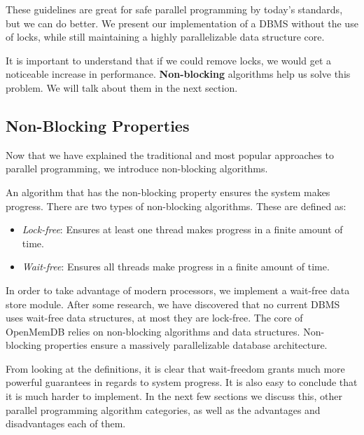 \documentclass[letterpaper, 12pt]{article}
\begin{document}
These guidelines are great for safe parallel programming by today's standards, but we can do better.
We present our implementation of a DBMS without the use of locks, while still maintaining a highly 
parallelizable data structure core.

\par\vspace{\baselineskip}

It is important to understand that if we could remove locks, we would get a noticeable increase in performance.
{\bfseries Non-blocking} algorithms help us solve this problem. We will talk about them in the next section.

\subsection{Non-Blocking Properties}

Now that we have explained the traditional and most popular approaches to parallel programming, we introduce non-blocking algorithms.

\par\vspace{\baselineskip}
An algorithm that has the non-blocking property ensures the system makes progress. There are 
two types of non-blocking algorithms. These are defined as:
\begin{itemize}
	\item \textit{Lock-free}: Ensures at least one thread makes progress in a finite amount of time.
	\item \textit{Wait-free}: Ensures all threads make progress in a finite amount of time.
\end{itemize}
In order to take advantage of modern processors, we implement a wait-free data store module.
After some research, we have discovered that no current DBMS uses wait-free data
structures, at most they are lock-free. The core of OpenMemDB relies on non-blocking algorithms and data
structures. Non-blocking properties ensure a massively parallelizable database architecture.

\par\vspace{\baselineskip}

From looking at the definitions, it is clear that wait-freedom grants much more
powerful guarantees in regards to system progress. It is also easy to conclude that
it is much harder to implement. In the next few sections we discuss this, other parallel 
programming algorithm categories, as well as the advantages and disadvantages each of them.
\end{document}
